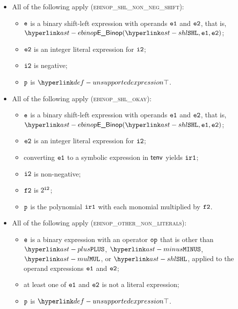 \begin{itemize}
  \item All of the following apply (\textsc{ebinop\_shl\_non\_neg\_shift}):
  \begin{itemize}
    \item $\texttt{e}$ is a binary shift-left expression with operands $\texttt{e1}$ and $\texttt{e2}$, that is, \\ $\EBinop(\SHL, \veone, \vetwo)$;
    \item $\texttt{e2}$ is an integer literal expression for $\texttt{i2}$;
    \item $\texttt{i2}$ is negative;
    \item $\texttt{p}$ is $\CannotBeTransformed$.
  \end{itemize}

  \item All of the following apply (\textsc{ebinop\_shl\_okay}):
  \begin{itemize}
    \item $\texttt{e}$ is a binary shift-left expression with operands $\texttt{e1}$ and $\texttt{e2}$, that is, \\ $\EBinop(\SHL, \veone, \vetwo)$;
    \item $\texttt{e2}$ is an integer literal expression for $\texttt{i2}$;
    \item converting $\texttt{e1}$ to a symbolic expression in $\textsf{tenv}$ yields $\texttt{ir1}$\ProseOrTypeErrorOrCannotBeTransformed;
    \item $\texttt{i2}$ is non-negative;
    \item $\texttt{f2}$ is $2^{\texttt{i2}}$;
    \item $\texttt{p}$ is the polynomial $\texttt{ir1}$ with each monomial multiplied by $\texttt{f2}$.
  \end{itemize}

  \item All of the following apply (\textsc{ebinop\_other\_non\_literals}):
  \begin{itemize}
    \item $\texttt{e}$ is a binary expression with an operator $\texttt{op}$ that is other than $\PLUS$, $\MINUS$, $\MUL$, or $\SHL$,
          applied to the operand expressions $\texttt{e1}$ and $\texttt{e2}$;
    \item at least one of $\texttt{e1}$ and $\texttt{e2}$ is not a literal expression;
    \item $\texttt{p}$ is $\CannotBeTransformed$.
  \end{itemize}


\end{itemize}
